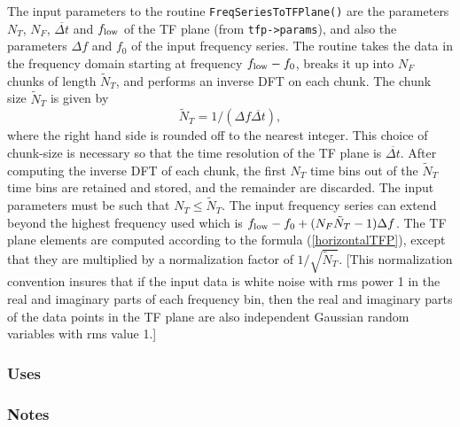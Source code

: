 The input parameters to the routine \verb+FreqSeriesToTFPlane()+ are the
parameters $N_T$, $N_F$, ${\overline {\Delta t}}$ and $f_{\rm low}$ of the TF
plane (from \verb+tfp->params+), and also the parameters $\Delta f$ and $f_0$
of the input frequency series.  The routine takes the data in the frequency
domain starting at frequency $f_{\rm low} - f_0$, breaks it up into $N_F$
chunks of length ${\tilde N}_T$, and performs an inverse DFT on each chunk.
The chunk size ${\tilde N}_T$ is given by
\begin{equation}
{\tilde N}_T =  1 /( \Delta f  {\overline {\Delta t}}),
\end{equation}
where the right hand side is rounded off to the nearest integer.  This choice
of chunk-size is necessary so that the time resolution of the TF plane is
${\overline {\Delta t}}$.  After computing the inverse DFT of each chunk, the
first $N_T$ time bins out of the ${\tilde N}_T$ time bins are retained and
stored, and the remainder are discarded.  The input parameters must be such
that $N_T \le {\tilde N}_T$.  The input frequency series can extend beyond the
highest frequency used which is $f_{\rm low} - f_0 + (N_F {\tilde N}_T
-1){\Delta f}$.  The TF plane elements are computed according to the formula
(\ref{horizontalTFP}), except that they are multiplied by a normalization
factor of $1/\sqrt{{\tilde N}_T}$.  [This normalization convention insures
that if the input data is white noise with rms power 1 in the real and
imaginary parts of each frequency bin, then the real and imaginary parts of
the data points in the TF plane are also independent Gaussian random variables
with rms value 1.]  

\subsubsection*{Uses}

\subsubsection*{Notes}

\vfill{\footnotesize}
















\newpage
